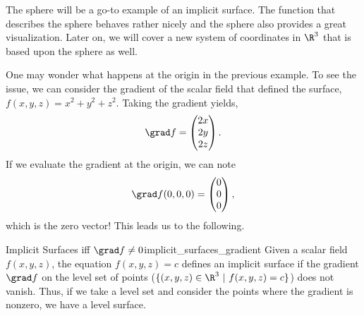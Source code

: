                 The sphere will be a go-to example of an implicit surface.  The function that describes the sphere behaves rather nicely and the sphere also provides a great visualization.  Later on, we will cover a new system of coordinates in $\R^3$ that is based upon the sphere as well.
                
                One may wonder what happens at the origin in the previous example.  To see the issue, we can consider the gradient of the scalar field that defined the surface, $f(x,y,z) = x^2+y^2+z^2$.  Taking the gradient yields,
                \[
                \grad f = \begin{pmatrix} 2x \\ 2y \\ 2z \end{pmatrix}.
                \]
                If we evaluate the gradient at the origin, we can note
                \[
                \grad f(0,0,0) = \begin{pmatrix} 0 \\ 0 \\ 0 \end{pmatrix},
                \]
                which is the zero vector!  This leads us to the following.
                
                \begin{thm}{Implicit Surfaces iff $\grad f \neq 0$}{implicit_surfaces_gradient}
                	Given a scalar field $f(x,y,z)$, the equation $f(x,y,z)=c$ defines an implicit surface if the gradient $\grad f$ on the level set of points ($\{(x,y,z) \in \R^3 ~\vert~ f(x,y,z)=c\}$) does not vanish. Thus, if we take a level set and consider the points where the gradient is nonzero, we have a level surface.
                \end{thm}
                
